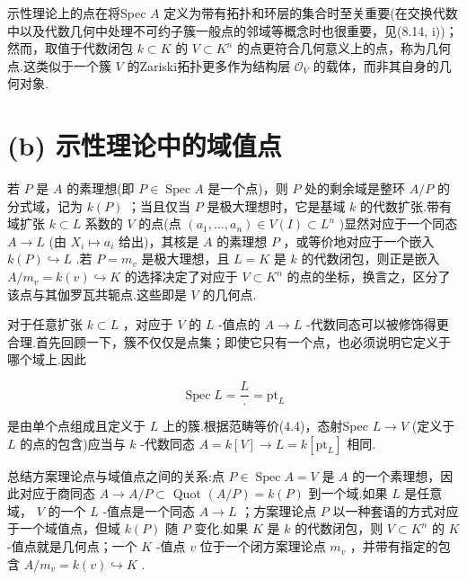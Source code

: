 示性理论上的点在将Spec \(A\) 定义为带有拓扑和环层的集合时至关重要(在交换代数中以及代数几何中处理不可约子簇一般点的邻域等概念时也很重要，见(8.14, i))；然而，取值于代数闭包 \(k \subset  K\) 的 \(V \subset  {K}^{n}\) 的点更符合几何意义上的点，称为几何点.这类似于一个簇 \(V\) 的Zariski拓扑更多作为结构层 \({\mathcal{O}}_{V}\) 的载体，而非其自身的几何对象.

\section{(b) 示性理论中的域值点}

若 \(P\) 是 \(A\) 的素理想(即 \(P \in  \operatorname{Spec}A\) 是一个点)，则 \(P\) 处的剩余域是整环 \(A/P\) 的分式域，记为 \(k\left( P\right)\) ；当且仅当 \(P\) 是极大理想时，它是基域 \(k\) 的代数扩张.带有域扩张 \(k \subset  L\) 系数的 \(V\) 的点(点 \(\left( {{a}_{1},\ldots ,{a}_{n}}\right)  \in  V\left( I\right)  \subset  {L}^{n}\) )显然对应于一个同态 \(A \rightarrow  L\) (由 \({X}_{i} \mapsto  {a}_{i}\) 给出)，其核是 \(A\) 的素理想 \(P\) ，或等价地对应于一个嵌入 \(k\left( P\right)  \hookrightarrow  L\) .若 \(P = {m}_{v}\) 是极大理想，且 \(L = K\) 是 \(k\) 的代数闭包，则正是嵌入 \(A/{m}_{v} = k\left( v\right)  \hookrightarrow  K\) 的选择决定了对应于 \(V \subset  {K}^{n}\) 的点的坐标，换言之，区分了该点与其伽罗瓦共轭点.这些即是 \(V\) 的几何点.

对于任意扩张 \(k \subset  L\) ，对应于 \(V\) 的 \(L\) -值点的 \(A \rightarrow  L\) -代数同态可以被修饰得更合理.首先回顾一下，簇不仅仅是点集；即使它只有一个点，也必须说明它定义于哪个域上.因此

\[
\operatorname{Spec}L = \frac{L}{ \cdot  } = {\mathrm{{pt}}}_{L}
\]

是由单个点组成且定义于 \(L\) 上的簇.根据范畴等价(4.4)，态射Spec \(L \rightarrow  V\) (定义于 \(L\) 的点的包含)应当与 \(k\) -代数同态 \(A = k\left\lbrack  V\right\rbrack   \rightarrow  L = k\left\lbrack  {\mathrm{{pt}}}_{L}\right\rbrack\) 相同.

总结方案理论点与域值点之间的关系:点 \(P \in  \operatorname{Spec}A = V\) 是 \(A\) 的一个素理想，因此对应于商同态 \(A \rightarrow  A/P \subset\) Quot \(\left( {A/P}\right)  = k\left( P\right)\) 到一个域.如果 \(L\) 是任意域， \(V\) 的一个 \(L\) -值点是一个同态 \(A \rightarrow  L\) ；方案理论点 \(P\) 以一种套语的方式对应于一个域值点，但域 \(k\left( P\right)\) 随 \(P\) 变化.如果 \(K\) 是 \(k\) 的代数闭包，则 \(V \subset  {K}^{n}\) 的 \(K\) -值点就是几何点；一个 \(K\) -值点 \(v\) 位于一个闭方案理论点 \({m}_{v}\) ，并带有指定的包含 \(A/{m}_{v} = k\left( v\right)  \hookrightarrow  K\) .

